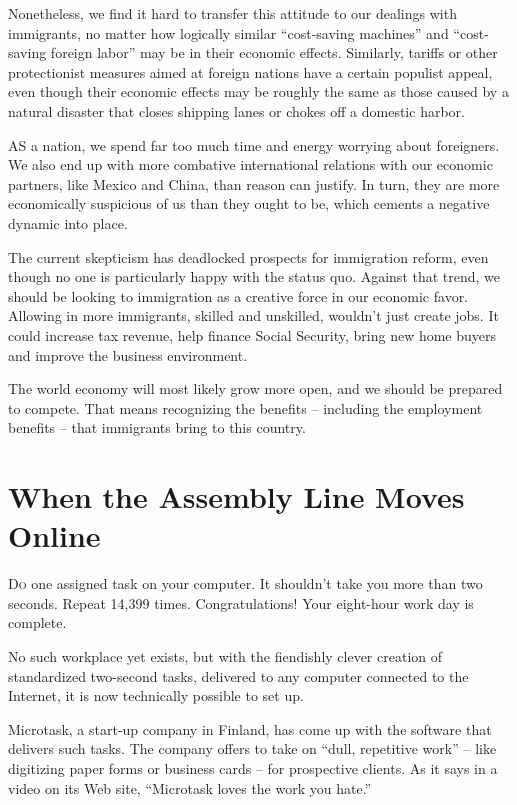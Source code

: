 ﻿\documentclass[12pt]{article}
\begin{document}
Nonetheless, we find it hard to transfer this attitude to our dealings with immigrants, no matter
how logically similar ``cost-saving machines'' and ``cost-saving foreign labor'' may be in their
economic effects. Similarly, tariffs or other protectionist measures aimed at foreign nations have a
certain populist appeal, even though their economic effects may be roughly the same as those caused
by a natural disaster that closes shipping lanes or chokes off a domestic harbor.

AS a nation, we spend far too much time and energy worrying about foreigners. We also end up with
more combative international relations with our economic partners, like Mexico and China, than
reason can justify. In turn, they are more economically suspicious of us than they ought to be,
which cements a negative dynamic into place.

The current skepticism has deadlocked prospects for immigration reform, even though no one is
particularly happy with the status quo. Against that trend, we should be looking to immigration as a
creative force in our economic favor. Allowing in more immigrants, skilled and unskilled, wouldn't
just create jobs. It could increase tax revenue, help finance Social Security, bring new home buyers
and improve the business environment.

The world economy will most likely grow more open, and we should be prepared to compete. That means
recognizing the benefits -- including the employment benefits -- that immigrants bring to this
country.

\section{When the Assembly Line Moves Online}

\lettrine{D}{o} one assigned task on your computer. It shouldn't take you
more than two seconds. Repeat 14,399 times. Congratulations! Your eight-hour work day is complete.

No such workplace yet exists, but with the fiendishly clever creation of standardized two-second
tasks, delivered to any computer connected to the Internet, it is now technically possible to set
up.

Microtask, a start-up company in Finland, has come up with the software that delivers such tasks.
The company offers to take on ``dull, repetitive work'' -- like digitizing paper forms or business
cards -- for prospective clients. As it says in a video on its Web site, ``Microtask loves the work
you hate.''
\end{document}
